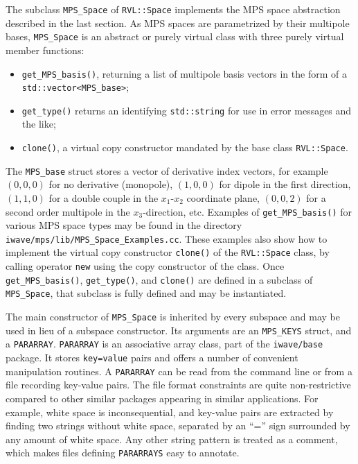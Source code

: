 The subclass {\tt MPS\_Space} of {\tt RVL::Space}
implements the MPS space abstraction described in the last section. 
As MPS spaces are parametrized by their multipole bases, {\tt MPS\_Space} is an
abstract or purely virtual class with three purely virtual member functions:
\begin{itemize}
	\item {\tt get\_MPS\_basis()}, returning a list of multipole basis vectors in the form of a \\
		{\tt std::vector<MPS\_base>};
	\item {\tt get\_type()} returns an identifying {\tt std::string} for use in error messages and the like;
	\item {\tt clone()}, a virtual copy constructor mandated by the base class {\tt RVL::Space}.
\end{itemize}
The {\tt MPS\_base} struct stores a vector of derivative index vectors, for example $(0,0,0)$ for no derivative (monopole), $(1,0,0)$ for dipole in the first direction, $(1,1,0)$ for a double couple in the $x_1$-$x_2$ coordinate plane, $(0,0,2)$ for a second order multipole in the $x_3$-direction, etc. 
Examples of {\tt get\_MPS\_basis()} for various MPS space types may be found in the directory {\tt iwave/mps/lib/MPS\_Space\_Examples.cc}. 
These examples also show how to implement the virtual copy constructor {\tt clone()} of the {\tt RVL::Space} class, by calling operator {\tt new} using the copy constructor of the class. 
Once {\tt get\_MPS\_basis()}, {\tt get\_type()}, and {\tt clone()} are defined in a subclass of {\tt MPS\_Space}, that subclass is fully defined and may be instantiated.

The main constructor of {\tt MPS\_Space} is inherited by every subspace and may be used in lieu of a subspace constructor. 
Its arguments are an {\tt MPS\_KEYS} struct, and a {\tt PARARRAY}.
{\tt PARARRAY} is an associative array class, part of the {\tt iwave/base} package. 
It stores {\tt key=value} pairs and offers a number of convenient manipulation routines. 
A {\tt PARARRAY} can be read from the command line or from a file recording key-value pairs.
The file format constraints are quite non-restrictive compared to other similar packages appearing in similar applications. 
For example, white space is inconsequential, and key-value pairs are extracted by finding two strings without white space, separated by an ``='' sign surrounded by any amount of white space. 
Any other string pattern is treated as a comment, which makes files defining {\tt PARARRAYS} easy to annotate.


